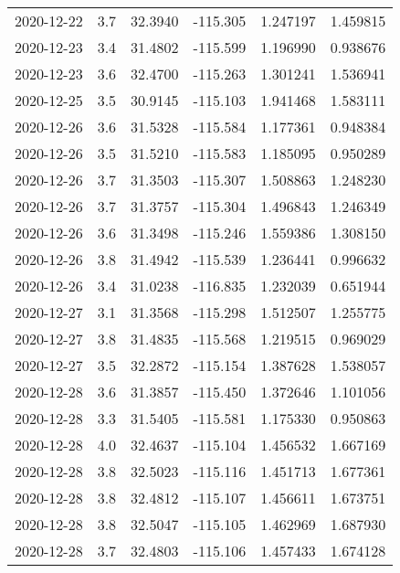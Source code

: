 \begin{tabular}{lrrrrr}
2020-12-22 &       3.7 &  32.3940 &  -115.305 &         1.247197 &         1.459815 \\
2020-12-23 &       3.4 &  31.4802 &  -115.599 &         1.196990 &         0.938676 \\
2020-12-23 &       3.6 &  32.4700 &  -115.263 &         1.301241 &         1.536941 \\
2020-12-25 &       3.5 &  30.9145 &  -115.103 &         1.941468 &         1.583111 \\
2020-12-26 &       3.6 &  31.5328 &  -115.584 &         1.177361 &         0.948384 \\
2020-12-26 &       3.5 &  31.5210 &  -115.583 &         1.185095 &         0.950289 \\
2020-12-26 &       3.7 &  31.3503 &  -115.307 &         1.508863 &         1.248230 \\
2020-12-26 &       3.7 &  31.3757 &  -115.304 &         1.496843 &         1.246349 \\
2020-12-26 &       3.6 &  31.3498 &  -115.246 &         1.559386 &         1.308150 \\
2020-12-26 &       3.8 &  31.4942 &  -115.539 &         1.236441 &         0.996632 \\
2020-12-26 &       3.4 &  31.0238 &  -116.835 &         1.232039 &         0.651944 \\
2020-12-27 &       3.1 &  31.3568 &  -115.298 &         1.512507 &         1.255775 \\
2020-12-27 &       3.8 &  31.4835 &  -115.568 &         1.219515 &         0.969029 \\
2020-12-27 &       3.5 &  32.2872 &  -115.154 &         1.387628 &         1.538057 \\
2020-12-28 &       3.6 &  31.3857 &  -115.450 &         1.372646 &         1.101056 \\
2020-12-28 &       3.3 &  31.5405 &  -115.581 &         1.175330 &         0.950863 \\
2020-12-28 &       4.0 &  32.4637 &  -115.104 &         1.456532 &         1.667169 \\
2020-12-28 &       3.8 &  32.5023 &  -115.116 &         1.451713 &         1.677361 \\
2020-12-28 &       3.8 &  32.4812 &  -115.107 &         1.456611 &         1.673751 \\
2020-12-28 &       3.8 &  32.5047 &  -115.105 &         1.462969 &         1.687930 \\
2020-12-28 &       3.7 &  32.4803 &  -115.106 &         1.457433 &         1.674128 \\

\end{tabular}
